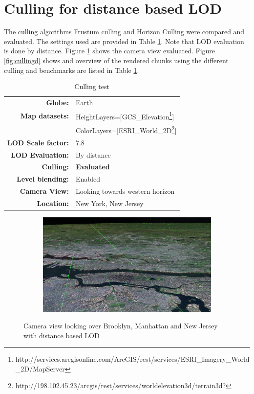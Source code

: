 


\clearpage
\section{Culling for distance based LOD}
\FloatBarrier
The culling algorithms Frustum culling and Horizon Culling were compared and evaluated. The settings used are provided in Table \ref{table:cullingd}. Note that LOD evaluation is done by distance. Figure \ref{fig:cullingdcam} shows the camera view evaluated. Figure \ref{fig:cullingd} shows and overview of the rendered chunks using the different culling and benchmarks are listed in Table \ref{table:cullingd}.

\begin{table}[h]
  \centering
  \caption[]{Culling test}
    \label{table:cullingd}
  \begin{tabular}{| r l |}
    \hline
      \textbf{Globe:}             & Earth \\
      \textbf{Map datasets:}      & HeightLayers=[GCS\_Elevation\footnote{http://services.arcgisonline.com/ArcGIS/rest/services/ESRI\_Imagery\_World\_2D/MapServer}] \\
                                  & ColorLayers=[ESRI\_World\_2D\footnote{http://198.102.45.23/arcgis/rest/services/worldelevation3d/terrain3d?}] \\
      \textbf{LOD Scale factor:}  & 7.8 \\
      \textbf{LOD Evaluation:}    & By distance \\
      \textbf{Culling:}           & \textbf{Evaluated} \\
      \textbf{Level blending:}    & Enabled \\
      \textbf{Camera View:}       & Looking towards western horizon\\
      \textbf{Location:}          & New York, New Jersey\\
    \hline
  \end{tabular}
\end{table}

\begin{figure}[h]
    \centering
    \begin{subfigure}[bt]{1.0\textwidth}
        \includegraphics[width=\textwidth]{figures/results/culling/cam_d.png}
    \end{subfigure}
    \caption{Camera view looking over Brooklyn, Manhattan and New Jersey with distance based LOD}
    \label{fig:cullingdcam}
\end{figure}

